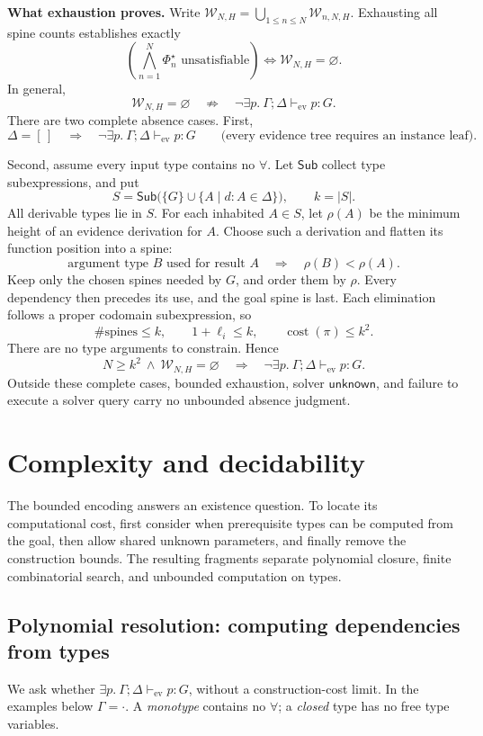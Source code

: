 \documentclass[10pt,a4paper]{article}
\newcommand{\Pj}[2]{\Gamma;\Delta\vdash_{\mathrm{ev}} #1:#2}
\begin{document}
\textbf{What exhaustion proves.}
Write $\mathcal W_{N,H}=\bigcup_{1\le n\le N}\mathcal W_{n,N,H}$.
Exhausting all spine counts establishes exactly
\[
 \left(\bigwedge_{n=1}^{N}\Phi_n^\star\text{ unsatisfiable}\right)
 \iff \mathcal W_{N,H}=\varnothing.
\]
In general,
\[
 \mathcal W_{N,H}=\varnothing
 \quad\not\Longrightarrow\quad
 \neg\exists p.\ \Pj p G.
\]
There are two complete absence cases. First,
\[
 \Delta=[\,]\quad\Longrightarrow\quad\neg\exists p.\ \Pj p G
 \qquad\text{(every evidence tree requires an instance leaf).}
\]

Second, assume every input type contains no $\forall$. Let $\mathsf{Sub}$ collect
type subexpressions, and put
\[
 S=\mathsf{Sub}\bigl(\{G\}\cup\{A\mid d:A\in\Delta\}\bigr),\qquad k=|S|.
\]
All derivable types lie in $S$. For each inhabited $A\in S$, let $\rho(A)$ be the
minimum height of an evidence derivation for $A$. Choose such a derivation and
flatten its function position into a spine:
\[
 \text{argument type }B\text{ used for result }A
 \quad\Longrightarrow\quad \rho(B)<\rho(A).
\]
Keep only the chosen spines needed by $G$, and order them by $\rho$.
Every dependency then precedes its use, and the goal spine is last.
Each elimination follows a proper codomain subexpression, so
\[
 \#\text{spines}\le k,\qquad
 1+\ell_i\le k,\qquad
 \operatorname{cost}(\pi)\le k^2.
\]
There are no type arguments to constrain. Hence
\[
 \boxed{
 N\ge k^2\ \land\ \mathcal W_{N,H}=\varnothing
 \quad\Longrightarrow\quad \neg\exists p.\ \Pj p G.}
\]
Outside these complete cases, bounded exhaustion, solver $\mathsf{unknown}$,
and failure to execute a solver query carry no unbounded absence judgment.

\newpage
\section{Complexity and decidability}
\label{sec:complexity}
The bounded encoding answers an existence question. To locate its computational
cost, first consider when prerequisite types can be computed from the goal,
then allow shared unknown parameters, and finally remove the construction bounds.
The resulting fragments separate polynomial closure, finite combinatorial search,
and unbounded computation on types.

\subsection{Polynomial resolution: computing dependencies from types}
\label{sec:polynomial-resolution}
We ask whether $\exists p.\ \Pj p G$, without a construction-cost limit.
In the examples below $\Gamma=\cdot$. A \emph{monotype} contains no $\forall$;
a \emph{closed} type has no free type variables.
\end{document}
